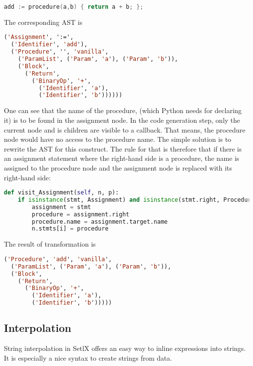 \begin{lstlisting}[language=c]
add := procedure(a,b) { return a + b; };
\end{lstlisting}

The corresponding AST is

\begin{lstlisting}[language=lisp]
('Assignment', ':=', 
  ('Identifier', 'add'), 
  ('Procedure', '', 'vanilla', 
    ('ParamList', ('Param', 'a'), ('Param', 'b')), 
    ('Block', 
      ('Return', 
        ('BinaryOp', '+', 
          ('Identifier', 'a'), 
          ('Identifier', 'b'))))))
\end{lstlisting}

One can see that the name of the procedure, (which Python needs for declaring it) is to be found in the assignment node. In the code generation step, only the current node and is children are visible to a callback. That means, the procedure node would have no access to the procedure name. The simple solution is to rewrite the AST for this construct. The rule for that is therefore that if there is an assignment statement where the right-hand side is a procedure, the name is assigned to the procedure node and the assignment node is replaced with its right-hand side:

\begin{lstlisting}[language=python]
def visit_Assignment(self, n, p):
    if isinstance(stmt, Assignment) and isinstance(stmt.right, Procedure):
        assignment = stmt
        procedure = assignment.right
        procedure.name = assignment.target.name
        n.stmts[i] = procedure
\end{lstlisting}

The result of transformation is

\begin{lstlisting}[language=lisp]
('Procedure', 'add', 'vanilla', 
  ('ParamList', ('Param', 'a'), ('Param', 'b')), 
  ('Block', 
    ('Return', 
      ('BinaryOp', '+',
        ('Identifier', 'a'), 
        ('Identifier', 'b')))))
\end{lstlisting}


%
\subsection{Interpolation}

String interpolation in SetlX offers an easy way to inline expressions into strings. It is especially a nice syntax to create strings from data. 


